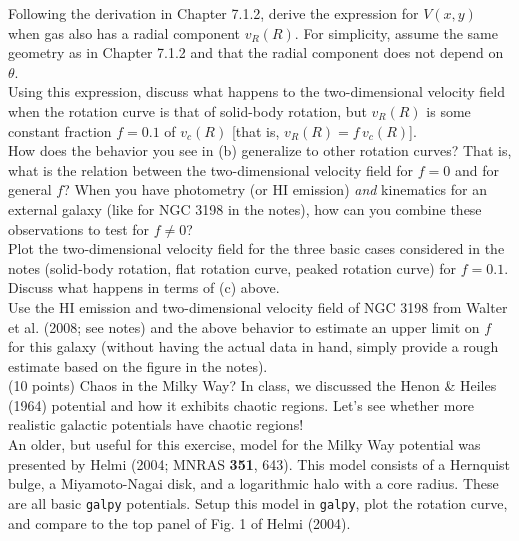 \documentclass[12pt]{article}
\begin{document}
 Following the derivation in Chapter 7.1.2, derive
the expression for $V(x,y)$ when gas also has a radial component
$v_R(R)$. For simplicity, assume the same geometry as in Chapter 7.1.2
and that the radial component does not depend on $\theta$.\\

 Using this expression, discuss what happens to the
two-dimensional velocity field when the rotation curve is that of
solid-body rotation, but $v_R(R)$ is some constant fraction $f=0.1$ of
$v_c(R)$ [that is, $v_R(R) = f\,v_c(R)$].\\

 How does the behavior you see in (b) generalize to
other rotation curves? That is, what is the relation between the
two-dimensional velocity field for $f=0$ and for general $f$? When you
have photometry (or HI emission) \emph{and} kinematics for an external
galaxy (like for NGC 3198 in the notes), how can you combine these
observations to test for $f \neq 0$?\\

 Plot the two-dimensional velocity field for the
three basic cases considered in the notes (solid-body rotation, flat
rotation curve, peaked rotation curve) for $f=0.1$. Discuss what
happens in terms of (c) above.\\

 Use the HI emission and two-dimensional velocity
field of NGC 3198 from Walter et al. (2008; see notes) and the above
behavior to estimate an upper limit on $f$ for this galaxy (without
having the actual data in hand, simply provide a rough estimate based
on the figure in the notes).\\

 (10 points) Chaos in the Milky Way? In
class, we discussed the Henon \& Heiles (1964) potential and how it
exhibits chaotic regions. Let's see whether more realistic galactic
potentials have chaotic regions!\\

 An older, but useful for this exercise, model for
the Milky Way potential was presented by Helmi (2004; MNRAS {\bf 351},
643). This model consists of a Hernquist bulge, a Miyamoto-Nagai disk,
and a logarithmic halo with a core radius. These are all basic
\texttt{galpy} potentials. Setup this model in \texttt{galpy}, plot
the rotation curve, and compare to the top panel of Fig. 1 of Helmi
(2004).\\
\end{document}
